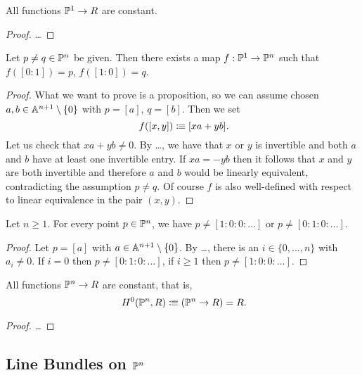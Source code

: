 \begin{lemma}
  All functions $\mathbb{P}^1 \to R$ are constant.
\end{lemma}

\begin{proof}
  \dots
\end{proof}

\begin{lemma}
  Let $p \neq q \in \mathbb{P}^n$ be given.
  Then there exists a map $f : \mathbb{P}^1 \to \mathbb{P}^n$
  such that $f([0 : 1]) = p$, $f([1 : 0]) = q$.
\end{lemma}

\begin{proof}
  What we want to prove is a proposition,
  so we can assume chosen $a, b \in \mathbb{A}^{n+1} \setminus \{0\}$
  with $p = [a]$, $q = [b]$.
  Then we set
  \[ f([x, y]) \colonequiv [xa + yb] \rlap{.}\]
  Let us check that $xa + yb \neq 0$.
  By \dots,
  we have that $x$ or $y$ is invertible
  and both $a$ and $b$ have at least one invertible entry.
  If $xa = - yb$
  then it follows that $x$ and $y$ are both invertible
  and therefore $a$ and $b$ would be linearly equivalent,
  contradicting the assumption $p \neq q$.
  Of course $f$ is also well-defined
  with respect to linear equivalence in the pair $(x, y)$.
\end{proof}

\begin{lemma}
  Let $n \geq 1$.
  For every point $p \in \mathbb{P}^n$,
  we have $p \neq [1 : 0 : 0 : \dots]$
  or $p \neq [0 : 1 : 0 : \dots]$.
\end{lemma}

\begin{proof}
  Let $p = [a]$ with $a \in \mathbb{A}^{n+1} \setminus \{0\}$.
  By \dots,
  there is an $i \in \{0, \dots, n\}$ with $a_i \neq 0$.
  If $i = 0$ then $p \neq [0 : 1 : 0 : \dots]$,
  if $i \geq 1$ then $p \neq [1 : 0 : 0 : \dots]$.
\end{proof}

\begin{theorem}
  All functions $\mathbb{P}^n \to R$ are constant,
  that is,
  \[ H^0(\bP^n, R) \colonequiv (\bP^n \to R) = R \rlap{.} \]
\end{theorem}

\begin{proof}
  \dots
\end{proof}

\subsection{Line Bundles on $\mathbb{P}^n$}

